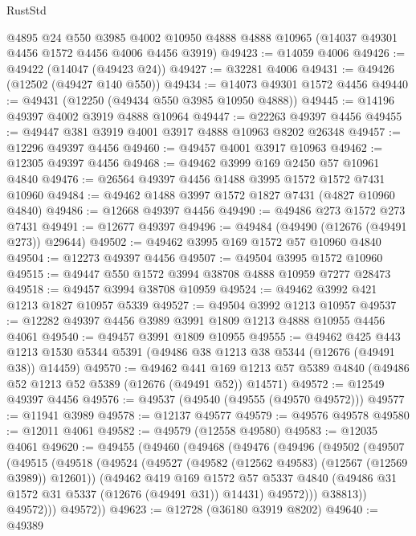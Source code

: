 \begin{lexlean}{RustStd}
\begin{coremodule}
    @4895
    @24
    @550
    @3985
    @4002
    @10950
    @4888
    @4888
    @10965
    (@14037 @49301 @4456 @1572 @4456 @4006 @4456 @3919)
@49423 := @14059 @4006
@49426 := @49422 (@14047 (@49423 @24))
@49427 := @32281 @4006
@49431 := @49426 (@12502 (@49427 @140 @550))
@49434 := @14073 @49301 @1572 @4456
@49440 := @49431 (@12250 (@49434 @550 @3985 @10950 @4888))
@49445 := @14196 @49397 @4002 @3919 @4888 @10964
@49447 := @22263 @49397 @4456
@49455 := @49447 @381 @3919 @4001 @3917 @4888 @10963 @8202 @26348
@49457 := @12296 @49397 @4456
@49460 := @49457 @4001 @3917 @10963
@49462 := @12305 @49397 @4456
@49468 := @49462 @3999 @169 @2450 @57 @10961 @4840
@49476 := @26564 @49397 @4456 @1488 @3995 @1572 @1572 @7431 @10960
@49484 := @49462 @1488 @3997 @1572 @1827 @7431 (@4827 @10960 @4840)
@49486 := @12668 @49397 @4456
@49490 := @49486 @273 @1572 @273 @7431
@49491 := @12677 @49397
@49496 := @49484 (@49490 (@12676 (@49491 @273)) @29644)
@49502 := @49462 @3995 @169 @1572 @57 @10960 @4840
@49504 := @12273 @49397 @4456
@49507 := @49504 @3995 @1572 @10960
@49515 := @49447 @550 @1572 @3994 @38708 @4888 @10959 @7277 @28473
@49518 := @49457 @3994 @38708 @10959
@49524 := @49462 @3992 @421 @1213 @1827 @10957 @5339
@49527 := @49504 @3992 @1213 @10957
@49537 := @12282 @49397 @4456 @3989 @3991 @1809 @1213 @4888 @10955 @4456 @4061
@49540 := @49457 @3991 @1809 @10955
@49555 := @49462
    @425
    @443
    @1213
    @1530
    @5344
    @5391
    (@49486 @38 @1213 @38 @5344 (@12676 (@49491 @38)) @14459)
@49570 := @49462
    @441
    @169
    @1213
    @57
    @5389
    @4840
    (@49486 @52 @1213 @52 @5389 (@12676 (@49491 @52)) @14571)
@49572 := @12549 @49397 @4456
@49576 := @49537 (@49540 (@49555 (@49570 @49572)))
@49577 := @11941 @3989
@49578 := @12137 @49577
@49579 := @49576 @49578
@49580 := @12011 @4061
@49582 := @49579 (@12558 @49580)
@49583 := @12035 @4061
@49620 := @49455
    (@49460
      (@49468
        (@49476
          (@49496
            (@49502
              (@49507
                (@49515
                  (@49518
                    (@49524
                      (@49527 (@49582 (@12562 @49583) (@12567 (@12569 @3989)) @12601))
                      (@49462
                        @419
                        @169
                        @1572
                        @57
                        @5337
                        @4840
                        (@49486 @31 @1572 @31 @5337 (@12676 (@49491 @31)) @14431)
                        @49572)))
                  @38813))
              @49572)))
        @49572))
@49623 := @12728 (@36180 @3919 @8202)
@49640 := @49389

\end{coremodule}
\end{lexlean}

